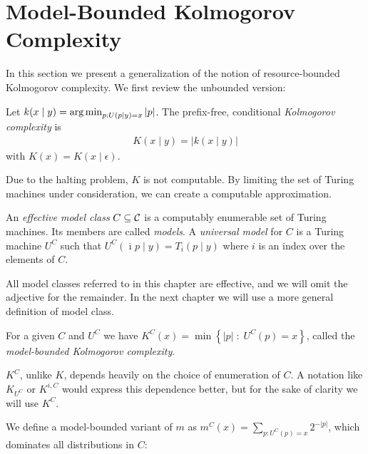 \section{Model-Bounded Kolmogorov Complexity}


In this section we present a generalization of the notion of resource-bounded Kolmogorov complexity. We first review the unbounded version:

\begin{definition}
Let $k(x\mid y) = \mathop{\arg\min}_{p:U(p\mid y) = x} |p|$. The prefix-free, conditional \emph{Kolmogorov complexity} is \begin{align*}
K(x\mid y) = |k(x\mid y)|
\end{align*} with $K(x) = K(x\mid \epsilon)$. \label{definition:kolmogorov-complexity}
\end{definition}
Due to the halting problem, $K$ is not computable. By limiting the set of Turing machines under consideration, we can create a computable approximation. 

\begin{definition}
An \emph{effective model class} $C \subseteq {\cal C}$ is a computably enumerable set of Turing machines. Its members are called \emph{models}. A \emph{universal model} for $C$ is a Turing machine $U^C$ such that $U^C(\overline{\imath}p\mid y) = T_i(p\mid y)$ where $i$ is an index over the elements of $C$. 
\end{definition}


All model classes referred to in this chapter are effective, and we will omit the adjective for the remainder. In the next chapter we will use a more general definition of model class. 

\begin{definition}
For a given $C$ and $U^C$ we have $K^C(x) = \min \left \{|p| \;:\; U^C(p) = x \right \}$, called the \emph{model-bounded Kolmogorov complexity}.
\end{definition}
$K^C$, unlike $K$, depends heavily on the choice of enumeration of $C$. A notation like $K_{U^C}$ or $K^{i, C}$ would express this dependence better, but for the sake of clarity we will use $K^C$.

We define a model-bounded variant of $m$ as $m^C(x) = \sum_{p: U^C(p) = x} 2^{-|p|}$, which dominates all distributions in $C$:

